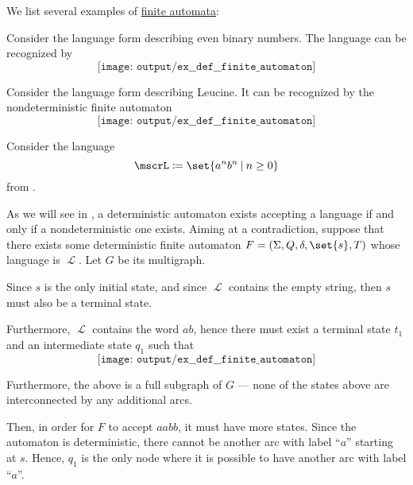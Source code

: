 \begin{example}\label{ex:def:finite_automaton}
  We list several examples of \hyperref[def:finite_automaton]{finite automata}:
  \begin{thmenum}
     Consider the language form  describing even binary numbers. The language can be recognized by
    \begin{equation*}
      \texttt{[image: output/ex\_\_def\_\_finite\_automaton]}
    \end{equation*}

     Consider the language form  describing Leucine. It can be recognized by the nondeterministic finite automaton
    \begin{equation*}
      \texttt{[image: output/ex\_\_def\_\_finite\_automaton]}
    \end{equation*}

     Consider the language
    \begin{equation*}
      \mscrL \coloneqq \set{ a^n b^n \given n \geq 0 }
    \end{equation*}
    from .

    As we will see in , a deterministic automaton exists accepting a language if and only if a nondeterministic one exists. Aiming at a contradiction, suppose that there exists some deterministic finite automaton \( F = (\Sigma, Q, \delta, \set{ s }, T) \) whose language is \( \mscrL \). Let \( G \) be its multigraph.

    Since \( s \) is the only initial state, and since \( \mscrL \) contains the empty string, then \( s \) must also be a terminal state.

    Furthermore, \( \mscrL \) contains the word \( ab \), hence there must exist a terminal state \( t_1 \) and an intermediate state \( q_1 \) such that
    \begin{equation*}
      \texttt{[image: output/ex\_\_def\_\_finite\_automaton]}
    \end{equation*}

    Furthermore, the above is a full subgraph of \( G \) --- none of the states above are interconnected by any additional arcs.

    Then, in order for \( F \) to accept \( aabb \), it must have more states. Since the automaton is deterministic, there cannot be another arc with label \enquote{\( a \)} starting at \( s \). Hence, \( q_1 \) is the only node where it is possible to have another arc with label \enquote{\( a \)}.


\end{thmenum}
\end{example}
